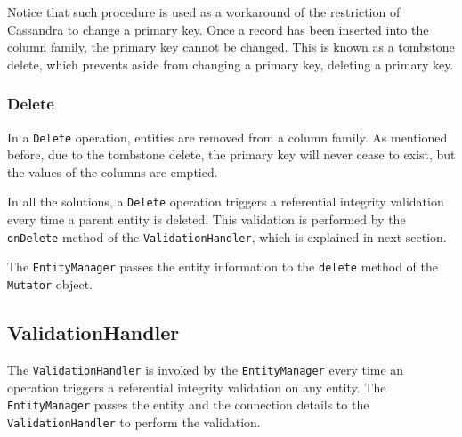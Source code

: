 		
		Notice that such procedure is used as a workaround of the restriction of
		Cassandra to change a primary key. Once a record has been
		inserted into the column family, the primary key cannot  be changed. This is
		known as a tombstone delete, which prevents aside from changing a primary
		key, deleting a primary key.
		
		\subsubsection{Delete}\label{ss:delete}
		In a  \texttt{Delete} operation, entities are removed from a column
		family. As mentioned before, due to the tombstone delete, the primary key
		will never cease to exist, but the values of the columns are emptied. 
		
		In all the solutions,  a \texttt{Delete} operation triggers a referential
		integrity validation every time a parent entity is deleted.  This validation
		is performed by the \texttt{onDelete} method of the
		\texttt{ValidationHandler}, which is explained in next section. 
		 
		 The 	\texttt{EntityManager} passes the entity information to the
		\texttt{delete} method of the \texttt{Mutator} object.
 		
		
		\subsection{ValidationHandler}\label{ss:VH}
		The \texttt{ValidationHandler} is invoked by the \texttt{EntityManager} every time
		an operation triggers a
		referential integrity validation on any entity. 
		The \texttt{EntityManager} passes the entity and the connection details  to
		the \texttt{ValidationHandler} to perform the validation.
		
